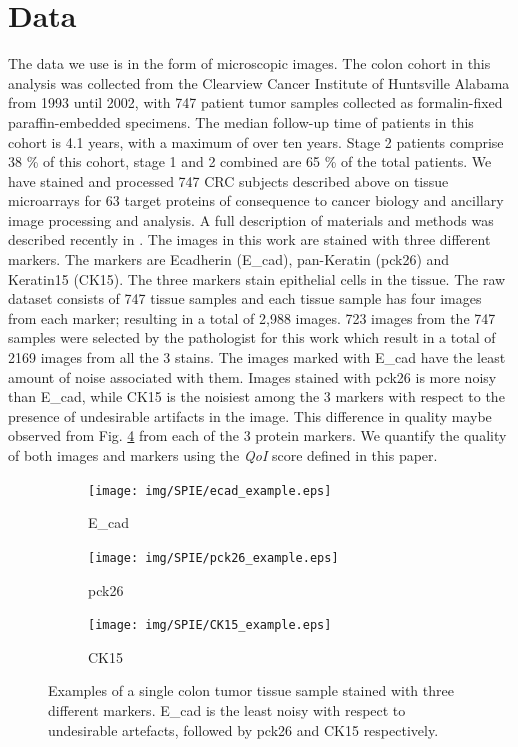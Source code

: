 \section{Data}

The data we use is in the form of microscopic images. The colon cohort in this analysis was collected from the Clearview Cancer Institute of Huntsville Alabama from 1993 until 2002, with 747 patient tumor samples collected as formalin-fixed paraffin-embedded specimens. The median follow-up time of patients in this cohort is 4.1 years, with a maximum of over ten years. Stage 2 patients comprise 38 \% of this cohort, stage 1 and 2 combined are 65 \% of the total patients. We have stained and processed 747 CRC subjects described above on tissue microarrays for 63 target proteins of consequence to cancer biology and ancillary image processing and analysis. A full description of materials and methods was described recently in \cite{gerdes2013highly}.
The images in this work are stained with three different markers. The markers are Ecadherin (E\_cad), pan-Keratin (pck26) and Keratin15 (CK15). The three markers stain epithelial cells in the tissue. The raw dataset consists of 747 tissue samples and each tissue sample has four images from each marker; resulting in a total of 2,988 images.  723 images from the 747 samples were selected by the pathologist for this work which result in a total of 2169 images from all the 3 stains.
The images marked with E\_cad have the least amount of noise associated with them. Images stained with pck26 is more noisy than E\_cad, while CK15 is the noisiest among the 3 markers with respect to the presence of undesirable artifacts in the image. This difference in quality maybe observed from Fig. \ref{fig:example_images} from each of the 3 protein markers. We quantify the quality of  both images and markers using the \textit{QoI} score defined in this paper. 

\begin{figure}
    \centering
    \begin{subfigure}[b]{0.3\textwidth}
        \centering
        \texttt{[image: img/SPIE/ecad\_example.eps]}
        \caption{E\_cad}
        \label{fig:ecad_example}
    \end{subfigure}
    \hfill
    \begin{subfigure}[b]{0.3\textwidth}
        \centering
        \texttt{[image: img/SPIE/pck26\_example.eps]}
        \caption{pck26}
        \label{fig:pck26_example}
    \end{subfigure}
    \hfill
    \begin{subfigure}[b]{0.3\textwidth}
        \centering
        \texttt{[image: img/SPIE/CK15\_example.eps]}
        \caption{CK15}
        \label{fig:CK15_example}
    \end{subfigure}
    \caption{Examples of a single colon tumor tissue sample stained with three different markers. E\_cad is the least noisy with respect to undesirable artefacts, followed by pck26 and CK15 respectively.}
    \label{fig:example_images}
\end{figure}


